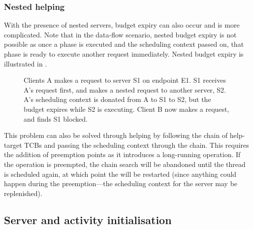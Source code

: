 \subsubsection{Nested helping}

With the presence of nested servers, budget expiry can also occur and is more complicated.
Note that in the data-flow scenario, nested budget expiry is not possible as once a phase is executed and the scheduling context passed on, that phase is ready to execute another request immediately.
Nested budget expiry is illustrated in .

\begin{figure}
\centering
\caption{Clients A makes a request to server S1 on endpoint E1. S1 receives A's request first, and makes a nested request to another server, S2. A's scheduling context is donated from A to S1 to S2, but the budget expires while S2 is executing. Client B now makes a request, and finds S1 blocked.}
\label{fig:nested-budget-expiry}
\end{figure}

This problem can also be solved through helping by following the chain of help-target TCBs and passing the scheduling context through the chain.
This requires the addition of preemption points as it introduces a long-running operation.
If the operation is preempted, the chain search will be abandoned until the thread is scheduled again, at which point the \call will be restarted (since anything could happen during the preemption---the scheduling context for the server may be replenished).

\subsection{Server and activity initialisation}

